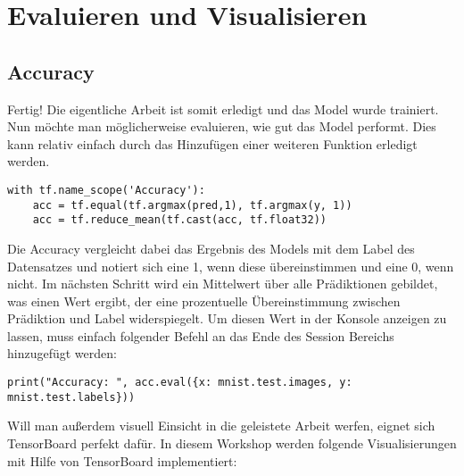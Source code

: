 \chapter{Evaluieren und Visualisieren}

\section{Accuracy}
Fertig! Die eigentliche Arbeit ist somit erledigt und das Model wurde trainiert. Nun möchte man möglicherweise evaluieren, wie gut das Model performt. Dies kann relativ einfach durch das Hinzufügen einer weiteren Funktion erledigt werden.

\lstset{language=Python}

\begin{lstlisting}
with tf.name_scope('Accuracy'):
    acc = tf.equal(tf.argmax(pred,1), tf.argmax(y, 1))
    acc = tf.reduce_mean(tf.cast(acc, tf.float32))
\end{lstlisting}


Die Accuracy vergleicht dabei das Ergebnis des Models mit dem Label des Datensatzes und notiert sich eine 1, wenn diese übereinstimmen und eine 0, wenn nicht. Im nächsten Schritt wird ein Mittelwert über alle Prädiktionen gebildet, was einen Wert ergibt, der eine prozentuelle Übereinstimmung zwischen Prädiktion und Label widerspiegelt. Um diesen Wert in der Konsole anzeigen zu lassen, muss einfach folgender Befehl an das Ende des Session Bereichs hinzugefügt werden:

\lstset{language=Python}

\begin{lstlisting}
print("Accuracy: ", acc.eval({x: mnist.test.images, y: mnist.test.labels}))
\end{lstlisting}

Will man außerdem visuell Einsicht in die geleistete Arbeit werfen, eignet sich TensorBoard perfekt dafür. In diesem Workshop werden folgende Visualisierungen mit Hilfe von TensorBoard implementiert:



